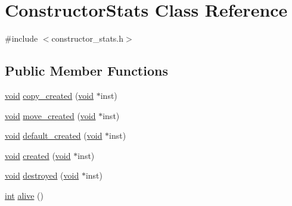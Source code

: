 \hypertarget{class_constructor_stats}{}\section{Constructor\+Stats Class Reference}
\label{class_constructor_stats}


{\ttfamily \#include $<$constructor\+\_\+stats.\+h$>$}

\subsection*{Public Member Functions}
\begin{DoxyCompactItemize}
\item 
\mbox{\hyperlink{_s_d_l__opengles2__gl2ext_8h_ae5d8fa23ad07c48bb609509eae494c95}{void}} \mbox{\hyperlink{class_constructor_stats_a472049c1c5981e89eed755dd8ec14e9a}{copy\+\_\+created}} (\mbox{\hyperlink{_s_d_l__opengles2__gl2ext_8h_ae5d8fa23ad07c48bb609509eae494c95}{void}} $\ast$inst)
\item 
\mbox{\hyperlink{_s_d_l__opengles2__gl2ext_8h_ae5d8fa23ad07c48bb609509eae494c95}{void}} \mbox{\hyperlink{class_constructor_stats_a72e330786f57958b5a829357c2ffacbd}{move\+\_\+created}} (\mbox{\hyperlink{_s_d_l__opengles2__gl2ext_8h_ae5d8fa23ad07c48bb609509eae494c95}{void}} $\ast$inst)
\item 
\mbox{\hyperlink{_s_d_l__opengles2__gl2ext_8h_ae5d8fa23ad07c48bb609509eae494c95}{void}} \mbox{\hyperlink{class_constructor_stats_aa4c9bf3190904864a8aba9fdb07de9d0}{default\+\_\+created}} (\mbox{\hyperlink{_s_d_l__opengles2__gl2ext_8h_ae5d8fa23ad07c48bb609509eae494c95}{void}} $\ast$inst)
\item 
\mbox{\hyperlink{_s_d_l__opengles2__gl2ext_8h_ae5d8fa23ad07c48bb609509eae494c95}{void}} \mbox{\hyperlink{class_constructor_stats_a72854cee1d7cb0b02c27dc88d81a8621}{created}} (\mbox{\hyperlink{_s_d_l__opengles2__gl2ext_8h_ae5d8fa23ad07c48bb609509eae494c95}{void}} $\ast$inst)
\item 
\mbox{\hyperlink{_s_d_l__opengles2__gl2ext_8h_ae5d8fa23ad07c48bb609509eae494c95}{void}} \mbox{\hyperlink{class_constructor_stats_a7e5d603e39065d5247d9acea2245ed1a}{destroyed}} (\mbox{\hyperlink{_s_d_l__opengles2__gl2ext_8h_ae5d8fa23ad07c48bb609509eae494c95}{void}} $\ast$inst)
\item 
\mbox{\hyperlink{warnings_8h_a74f207b5aa4ba51c3a2ad59b219a423b}{int}} \mbox{\hyperlink{class_constructor_stats_a376fdb0d0e0c053aacd1077d0c85c88f}{alive}} ()
\item 

\end{DoxyCompactItemize}
